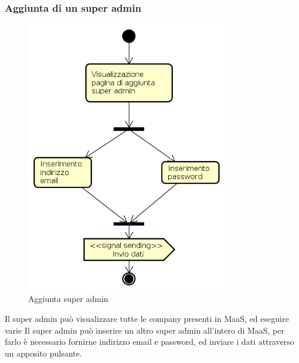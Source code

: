 \subsubsection{Aggiunta di un super admin}
\begin{figure}[H]
\begin{center}
\includegraphics[height=12cm]{res/sections/backend/activities/aggiuntaSuperAdmin.png}
\caption{Aggiunta super admin}
\end{center}
\end{figure}
Il super admin può visualizzare tutte le company presenti in MaaS, ed eseguire varie Il super admin può inserire un altro super admin all'intero di MaaS, per farlo è necessario fornirne indirizzo email e password, ed inviare i dati attraverso un apposito pulsante.
